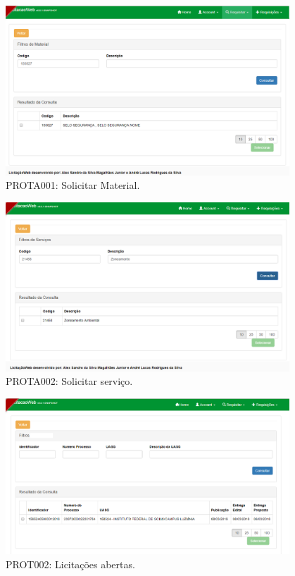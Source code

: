 \begin{anexosenv}
\begin{figure}[htbp]
    \centering
    \includegraphics[width=0.95\textwidth]{figuras/prototipoA001.png}
    \caption[PROTA001: Solicitar Material]{PROTA001: Solicitar Material.}
    \label{PROTA001}
\end{figure}

\begin{figure}[htbp]
    \centering   
    \includegraphics[width=0.95\textwidth]{figuras/prototipoA002.png}
    \caption[PROTA002: Solicitar serviço]{PROTA002: Solicitar serviço.}
    \label{PROTA002}
\end{figure}

\begin{figure}[htbp]
    \centering
    \includegraphics[width=0.95\textwidth]{figuras/prototipo002.png}
    \caption[PROT002: Licitações abertas]{PROT002: Licitações abertas.}
    \label{PROT002}
\end{figure}


\end{anexosenv}
